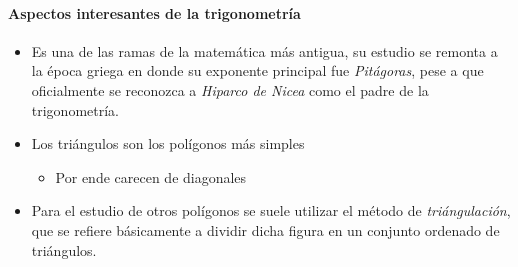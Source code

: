 \paragraph{Aspectos interesantes de la trigonometría}
\begin{itemize}
  \item Es una de las ramas de la matemática más antigua, su estudio se remonta 
  a la época griega en donde su exponente principal fue \textit{Pitágoras}, pese 
  a que oficialmente se reconozca a \textit{Hiparco de Nicea} como el padre de 
  la trigonometría.

  \item Los triángulos son los polígonos más simples
  \begin{itemize}
    \item Por ende carecen de diagonales
  \end{itemize}

  \item Para el estudio de otros polígonos se suele utilizar el método de 
  \textit{triángulación}, que se refiere básicamente a dividir dicha figura en 
  un conjunto ordenado de triángulos.
\end{itemize}

